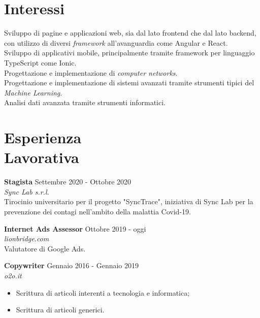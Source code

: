 \documentclass[margin, 10pt]{res}
\begin{document}
\begin{resume}
\section{Interessi}
Sviluppo di pagine e applicazioni web, sia dal lato frontend che dal lato backend, con utilizzo di diversi \textit{framework} all'avanguardia come Angular e React. \\
Sviluppo di applicativi mobile, principalmente tramite framework per linguaggio TypeScript come Ionic. \\
Progettazione e implementazione di \textit{computer networks}. \\
Progettazione e implementazione di sistemi avanzati tramite strumenti tipici del \textit{Machine Learning}. \\
Analisi dati avanzata tramite strumenti informatici.



 
\section{Esperienza \\ Lavorativa}

\textbf{Stagista} \hfill Settembre 2020 - Ottobre 2020 \\
\textit{Sync Lab s.r.l.} \\
Tirocinio universitario per il progetto "SyncTrace", iniziativa di Sync Lab per la prevenzione dei contagi nell'ambito della malattia Covid-19.


\textbf{Internet Ads Assessor} \hfill Ottobre 2019 - oggi \\
\textit{lionbridge.com} \\
Valutatore di Google Ads.

\textbf{Copywriter} \hfill Gennaio 2016 - Gennaio 2019 \\
\textit{o2o.it}
\begin{itemize}
\item Scrittura di articoli interenti a tecnologia e informatica;
\item Scrittura di articoli generici.
\end{itemize} 




\end{resume}
\end{document}
